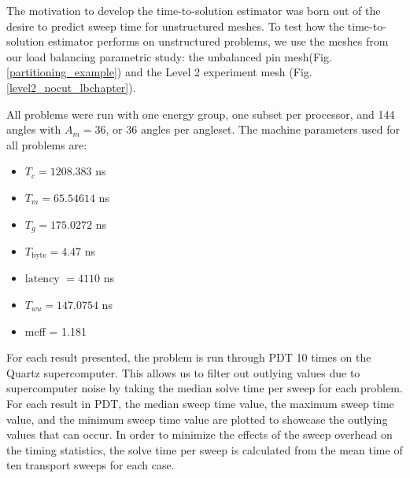 The motivation to develop the time-to-solution estimator was born out of the desire to predict sweep time for unstructured meshes.
To test how the time-to-solution estimator performs on unstructured problems, we use the meshes from our load balancing parametric study: the unbalanced pin mesh(Fig. \ref{partitioning_example}) and the Level 2 experiment mesh (Fig. \ref{level2_nocut_lbchapter}).

All problems were run with one energy group, one subset per processor, and 144 angles with $A_m = 36$, or 36 angles per angleset. The machine parameters used for all problems are:
\begin{itemize}
  \item $T_c = 1208.383$ ns
  \item $T_m = 65.54614$ ns
  \item $T_g = 175.0272$ ns
  \item $T_\text{byte} = 4.47$ ns
  \item $\text{latency }= 4110$ ns
  \item $T_{wu} = 147.0754$ ns
  \item mcff = 1.181
\end{itemize}

For each result presented, the problem is run through PDT 10 times on the Quartz supercomputer.
This allows us to filter out outlying values due to supercomputer noise by taking the median solve time per sweep for each problem.
For each result in PDT, the median sweep time value, the maximum sweep time value, and the minimum sweep time value are plotted to showcase the outlying values that can occur.
In order to minimize the effects of the sweep overhead on the timing statistics, the solve time per sweep is calculated from the mean time of ten transport sweeps for each case.

